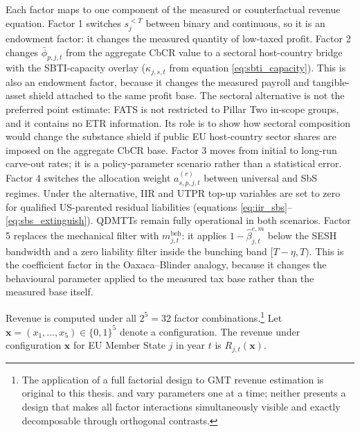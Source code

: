 \documentclass[11pt,a4paper]{article}
\begin{document}
Each factor maps to one component of the measured or counterfactual revenue equation. Factor 1 switches $s_j^{<T}$ between binary and continuous, so it is an endowment factor: it changes the measured quantity of low-taxed profit. Factor 2 changes $\bar{\phi}_{p,j,t}$ from the aggregate CbCR value to a sectoral host-country bridge with the SBTI-capacity overlay ($\kappa_{j,s,t}$ from equation \ref{eq:sbti_capacity}). This is also an endowment factor, because it changes the measured payroll and tangible-asset shield attached to the same profit base. The sectoral alternative is not the preferred point estimate: FATS is not restricted to Pillar Two in-scope groups, and it contains no ETR information. Its role is to show how sectoral composition would change the substance shield if public EU host-country sector shares are imposed on the aggregate CbCR base. Factor 3 moves from initial to long-run carve-out rates; it is a policy-parameter scenario rather than a statistical error. Factor 4 switches the allocation weight $a_{s,p,j,t}^{(r)}$ between universal and SbS regimes. Under the alternative, IIR and UTPR top-up variables are set to zero for qualified US-parented residual liabilities (equations \ref{eq:iir_sbs}--\ref{eq:sbs_extinguish}). QDMTTs remain fully operational in both scenarios. Factor 5 replaces the mechanical filter with $m_{j,t}^{\text{beh}}$: it applies $1-\hat{\beta}_{j,t}^{e,m}$ below the SESH bandwidth and a zero liability filter inside the bunching band $[T-\eta,T)$. This is the coefficient factor in the Oaxaca--Blinder analogy, because it changes the behavioural parameter applied to the measured tax base rather than the measured base itself.

Revenue is computed under all $2^5 = 32$ factor combinations.\footnote{The application of a full factorial design to GMT revenue estimation is original to this thesis. \citet{barake2022} and \citet{hugger2026} vary parameters one at a time; neither presents a design that makes all factor interactions simultaneously visible and exactly decomposable through orthogonal contrasts.} Let $\mathbf{x} = (x_1, \ldots, x_5) \in \{0, 1\}^5$ denote a configuration. The revenue under configuration $\mathbf{x}$ for EU Member State $j$ in year $t$ is $R_{j,t}(\mathbf{x})$.
\end{document}
